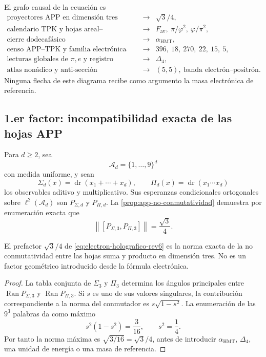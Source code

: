 El grafo causal de la ecuación es
\[
\begin{array}{ccl}
\text{proyectores APP en dimensión tres}
&\longrightarrow& \sqrt3/4,\\[2mm]
\text{calendario TPK y hojas areal--volumétrica}
&\longrightarrow&
F_{\mathrm{av}},\ \pi/\varphi^2,\
\varphi/\pi^2,\\[2mm]
\text{cierre dodecafásico}
&\longrightarrow&\alpha_{\mathrm{HMT}},\\[2mm]
\text{censo APP--TPK y familia electrónica}
&\longrightarrow&396,\ 18,\ 270,\ 22,\ 15,\ 5,\\[2mm]
\text{lecturas globales de }\pi,e\text{ y registro}
&\longrightarrow&\Delta_4,\\[2mm]
\text{atlas nonádico y anti-sección}
&\longrightarrow&(5,5),\
\text{banda electrón--positrón}.
\end{array}
\]
Ninguna flecha de este diagrama recibe como argumento la masa electrónica
de referencia.

\subsection{1.er factor: incompatibilidad exacta de las hojas APP}

Para \(d\geq2\), sea
\[
 \mathscr A_d=\{1,\ldots,9\}^d
\]
con medida uniforme, y sean
\[
 \Sigma_d(x)=\operatorname{dr}(x_1+\cdots+x_d),
 \qquad
 \Pi_d(x)=\operatorname{dr}(x_1\cdots x_d)
\]
los observables aditivo y multiplicativo. Sus esperanzas condicionales
ortogonales sobre \(\ell^2(\mathscr A_d)\) son
\(P_{\Sigma,d}\) y \(P_{\Pi,d}\). La
\cref{prop:app-no-conmutatividad} demuestra por enumeración exacta que
\[
 \left\|[P_{\Sigma,3},P_{\Pi,3}]\right\|
 =\frac{\sqrt3}{4}.
\]

\begin{proposition}
\label{prop:prefactor-app-electron-rev6}
El prefactor \(\sqrt3/4\) de
\cref{eq:electron-holografico-rev6} es la norma exacta de la
no conmutatividad entre las hojas suma y producto en dimensión tres.
No es un factor geométrico introducido desde la fórmula electrónica.
\end{proposition}

\begin{proof}
La tabla conjunta de \(\Sigma_3\) y \(\Pi_3\) determina los ángulos
principales entre
\(\operatorname{Ran}P_{\Sigma,3}\) y
\(\operatorname{Ran}P_{\Pi,3}\). Si \(s\) es uno de sus valores
singulares, la contribución correspondiente a la norma del conmutador es
\(s\sqrt{1-s^2}\). La enumeración de las \(9^3\) palabras da como máximo
\[
 s^2(1-s^2)=\frac3{16},
 \qquad s^2=\frac14.
\]
Por tanto la norma máxima es \(\sqrt{3/16}=\sqrt3/4\), antes de
introducir \(\alpha_{\mathrm{HMT}}\), \(\Delta_4\), una unidad de energía
o una masa de referencia.
\end{proof}

